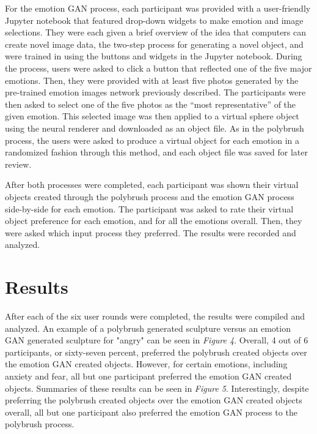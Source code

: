 \documentclass{sigchi}
\begin{document}
For the emotion GAN process, each participant was provided with a user-friendly Jupyter notebook that featured drop-down widgets to make emotion and image selections. They were each given a brief overview of the idea that computers can create novel image data, the two-step process for generating a novel object, and were trained in using the buttons and widgets in the Jupyter notebook. During the process, users were asked to click a button that reflected one of the five major emotions. Then, they were provided with at least five photos generated by the pre-trained emotion images network previously described. The participants were then asked to select one of the five photos as the “most representative” of the given emotion. This selected image was then applied to a virtual sphere object using the neural renderer and downloaded as an object file. As in the polybrush process, the users were asked to produce a virtual object for each emotion in a randomized fashion through this method, and each object file was saved for later review.  

After both processes were completed, each participant was shown their virtual objects created through the polybrush process and the emotion GAN process side-by-side for each emotion. The participant was asked to rate their virtual object preference for each emotion, and for all the emotions overall. Then, they were asked which input process they preferred. The results were recorded and analyzed. 

\section{Results}

After each of the six user rounds were completed, the results were compiled and analyzed. An example of a polybrush generated sculpture versus an emotion GAN generated sculpture for "angry" can be seen in \emph {Figure 4}. Overall, 4 out of 6 participants, or sixty-seven percent, preferred the polybrush created objects over the emotion GAN created objects. However, for certain emotions, including anxiety and fear, all but one participant preferred the emotion GAN created objects. Summaries of these results can be seen in \emph {Figure 5}. Interestingly, despite preferring the polybrush created objects over the emotion GAN created objects overall, all but one participant also preferred the emotion GAN process to the polybrush process. 
\end{document}
